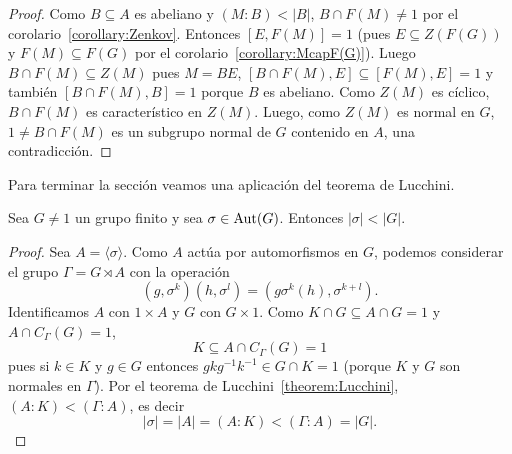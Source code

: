 \begin{proof}
	\medskip
	Como $B\subseteq A$ es abeliano y $(M:B)<|B|$, $B\cap F(M)\ne1$ por el
	corolario~\ref{corollary:Zenkov}. Entonces $[E,F(M)]=1$ (pues $E\subseteq
	Z(F(G))$ y $F(M)\subseteq F(G)$ por el corolario~\ref{corollary:McapF(G)}).
	Luego $B\cap F(M)\subseteq Z(M)$ pues $M=BE$, $[B\cap F(M),E]\subseteq
	[F(M),E]=1$ y también $[B\cap F(M),B]=1$ porque $B$ es abeliano. Como
	$Z(M)$ es cíclico, $B\cap F(M)$ es característico en $Z(M)$. Luego, como
	$Z(M)$ es normal en $G$, $1\ne B\cap F(M)$ es un subgrupo normal de $G$
	contenido en $A$, una contradicción.
\end{proof}

Para terminar la sección veamos una aplicación del teorema de Lucchini.

\begin{corollary}[Horosevskii]
	Sea $G\ne1$ un grupo finito y sea $\sigma\in\operatorname{Aut}(G)$. Entonces
	$|\sigma|<|G|$.
\end{corollary}

\begin{proof}
	Sea $A=\langle\sigma\rangle$. Como $A$ actúa por automorfismos en $G$,
	podemos considerar el grupo $\Gamma=G\rtimes A$ con la operación 
	\[
	(g,\sigma^k)(h,\sigma^l)=(g\sigma^k(h),\sigma^{k+l}).
	\]
	Identificamos $A$ con $1\times A$ y $G$ con $G\times 1$. 
	Como $K\cap G\subseteq A\cap G=1$ y $A\cap C_{\Gamma}(G)=1$, 
	\[
		K\subseteq A\cap C_{\Gamma}(G)=1
	\]
	pues si $k\in K$ y $g\in G$ entonces $gkg^{-1}k^{-1}\in G\cap K=1$ (porque
	$K$ y $G$ son normales en $\Gamma$).  Por el teorema de
	Lucchini~\ref{theorem:Lucchini}, $(A:K)<(\Gamma:A)$, es decir
	\[
		|\sigma|=|A|=(A:K)<(\Gamma:A)=|G|.
	\]
\end{proof}